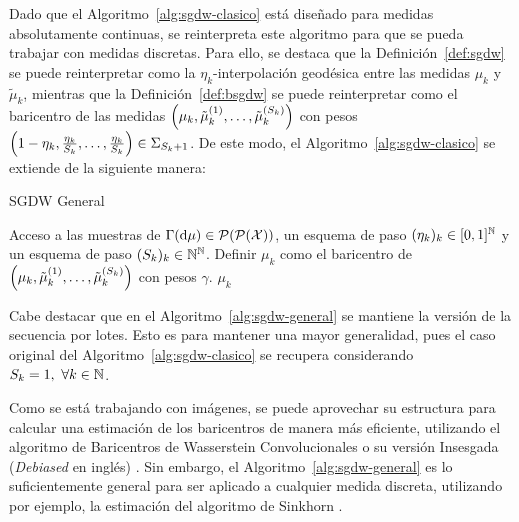 Dado que el Algoritmo~\ref{alg:sgdw-clasico} está diseñado para medidas absolutamente continuas, se reinterpreta este algoritmo para que se pueda trabajar con medidas discretas. Para ello, se destaca que la Definición~\ref{def:sgdw} se puede reinterpretar como la $\eta_k$-interpolación geodésica entre las medidas $\mu_k$ y $\tilde \mu_k$, mientras que la Definición~\ref{def:bsgdw} se puede reinterpretar como el baricentro de las medidas $\qty( \mu_k, \tilde\mu_k^{(1)}, \dots, \tilde\mu_k^{(S_k)} )$ con pesos $\qty(1-\eta_k, \frac{\eta_k}{S_k}, \dots, \frac{\eta_k}{S_k}) \in \Simplex[S_k+1]$. De este modo, el Algoritmo~\ref{alg:sgdw-clasico} se extiende de la siguiente manera:
\begin{algorithm}[H]
    \caption{SGDW General}
    \label{alg:sgdw-general}
    \begin{algorithmic}[1]
        \Require Acceso a las muestras de $\Gamma(\dd \mu) \in \ProbSpace[\ProbSpace]$, un esquema de paso $(\eta_k)_k \in [0, 1]^\N$ y un esquema de paso $(S_k)_k \in \N^\N$.
        \Repeat
        \State Definir $\mu_k$ como el baricentro de $\qty( \mu_k, \tilde\mu_k^{(1)}, \dots, \tilde\mu_k^{(S_k)} )$ con pesos $\gamma$.
        \State\Return $\mu_k$
    \end{algorithmic}
\end{algorithm}

Cabe destacar que en el Algoritmo~\ref{alg:sgdw-general} se mantiene la versión de la secuencia por lotes. Esto es para mantener una mayor generalidad, pues el caso original del Algoritmo~\ref{alg:sgdw-clasico} se recupera considerando $S_k=1,\ \forall k\in\N$.

Como se está trabajando con imágenes, se puede aprovechar su estructura para calcular una estimación de los baricentros de manera más eficiente, utilizando el algoritmo de Baricentros de Wasserstein Convolucionales \cite{solomon2015convolutional} o su versión Insesgada (\textit{Debiased} en inglés) \cite{janati2020debiased}. Sin embargo, el Algoritmo~\ref{alg:sgdw-general} es lo suficientemente general para ser aplicado a cualquier medida discreta, utilizando por ejemplo, la estimación del algoritmo de Sinkhorn \cite{cuturi2013sinkhorn}.

